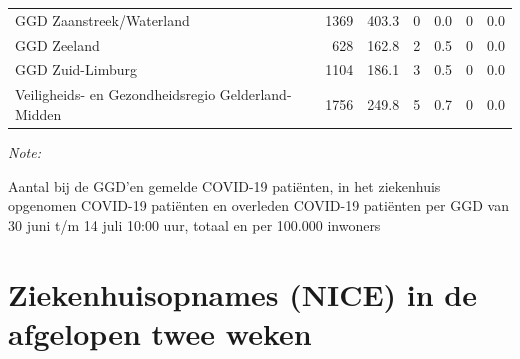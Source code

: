 \documentclass[
  english,
  man,floatsintext]{apa6}
\begin{document}
\begin{table}
\begin{threeparttable}
\begin{tabular}{lrrrrrr}
GGD Zaanstreek/Waterland & 1369 & 403.3 & 0 & 0.0 & 0 & 0.0\\
GGD Zeeland & 628 & 162.8 & 2 & 0.5 & 0 & 0.0\\
GGD Zuid-Limburg & 1104 & 186.1 & 3 & 0.5 & 0 & 0.0\\
Veiligheids- en Gezondheidsregio Gelderland-Midden & 1756 & 249.8 & 5 & 0.7 & 0 & 0.0\\
\bottomrule
\end{tabular}
\begin{tablenotes}
\item \textit{Note: } 
\item Aantal bij de GGD’en gemelde COVID-19 patiënten, in het ziekenhuis opgenomen COVID-19 patiënten en overleden COVID-19 patiënten per GGD van 30 juni t/m 14 juli 10:00 uur, totaal en per 100.000 inwoners
\end{tablenotes}
\end{threeparttable}
\endgroup{}
\end{table}

\newpage

\hypertarget{ziekenhuisopnames-nice-in-de-afgelopen-twee-weken}{%
\section{Ziekenhuisopnames (NICE) in de afgelopen twee weken}\label{ziekenhuisopnames-nice-in-de-afgelopen-twee-weken}}
\end{document}
